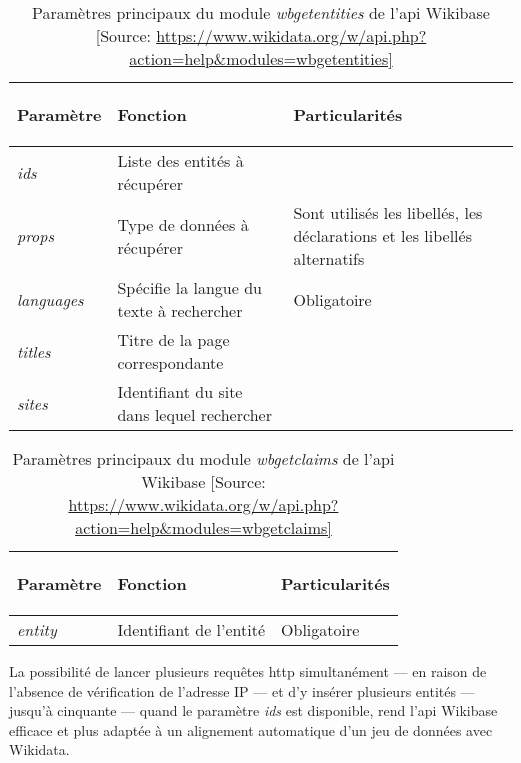 \begin{table}[h!]
	\centering
	\begin{tabularx}{15cm}{|X|X|X|}
		\hline
		\begin{center}Paramètre\end{center}&\begin{center}Fonction\end{center}&\begin{center}Particularités\end{center}  \tabularnewline \hline
		\textit{ids}&Liste des entités à récupérer&\tabularnewline \hline
		\textit{props}&Type de données à récupérer&Sont utilisés les libellés, les déclarations et les libellés alternatifs\tabularnewline \hline
		\textit{languages}&Spécifie la langue du texte à rechercher&Obligatoire\tabularnewline \hline
		\textit{titles}&Titre de la page correspondante&\tabularnewline \hline
		\textit{sites}&Identifiant du site dans lequel rechercher&\tabularnewline \hline
	\end{tabularx}
	\caption[Paramètres principaux du module \textit{wbgetentities} de l'\ac{api} Wikibase]{Paramètres principaux du module \textit{wbgetentities} de l'\ac{api} Wikibase [Source: \url{https://www.wikidata.org/w/api.php?action=help\&modules=wbgetentities]}}
	\label{wbgetentities}
\end{table} 


\begin{table}[h!]
	\centering
	\begin{tabularx}{15cm}{|X|X|X|}
		\hline
		\begin{center}Paramètre\end{center}&\begin{center}Fonction\end{center}&\begin{center}Particularités\end{center}  \tabularnewline \hline
		\textit{entity}&Identifiant de l'entité&Obligatoire \tabularnewline \hline
	\end{tabularx}
	\caption[Paramètres principaux du module \textit{wbgetclaims} de l'\ac{api} Wikibase]{Paramètres principaux du module \textit{wbgetclaims} de l'\ac{api} Wikibase [Source: \url{https://www.wikidata.org/w/api.php?action=help\&modules=wbgetclaims]}}
	\label{wbgetclaims}
\end{table} 
\medskip

La possibilité de lancer plusieurs requêtes \ac{http} simultanément --- en raison de l'absence de vérification de l'adresse IP --- et d'y insérer plusieurs entités --- jusqu'à cinquante --- quand le paramètre \textit{ids} est disponible, rend l'\ac{api} Wikibase efficace et plus adaptée à un alignement automatique d'un jeu de données avec Wikidata.

